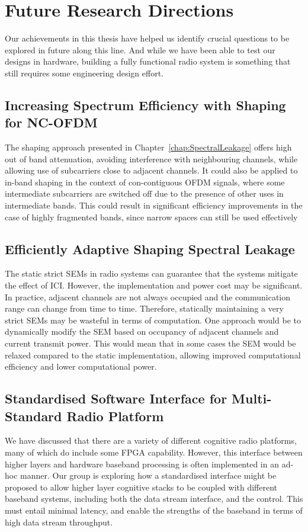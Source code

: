 \section{Future Research Directions}

Our achievements in this thesis have helped us identify crucial questions to be explored in future along this line. And while we have been able to test our designs in hardware, building a fully functional radio system is something that still requires some engineering design effort.

\subsection{Increasing Spectrum Efficiency with Shaping for NC-OFDM}
The shaping approach presented in Chapter~\ref{chap:SpectralLeakage} offers high out of band attenuation, avoiding interference with neighbouring channels, while allowing use of subcarriers close to adjacent channels.
It could also be applied to in-band shaping in the context of con-contiguous OFDM signals, where some intermediate subcarriers are switched off due to the presence of other uses in intermediate bands.
This could result in significant efficiency improvements in the case of highly fragmented bands, since narrow spaces can still be used effectively

\subsection{Efficiently Adaptive Shaping Spectral Leakage}
The static strict SEMs in radio systems can guarantee that the systems mitigate the effect of ICI. However, the implementation and power cost may be significant.
In practice, adjacent channels are not always occupied and the communication range can change from time to time. Therefore, statically maintaining a very strict SEMs may be wasteful in terms of computation.
One approach would be to dynamically modify the SEM based on occupancy of adjacent channels and current transmit power.
This would mean that in some cases the SEM would be relaxed compared to the static implementation, allowing improved computational efficiency and lower computational power.

\subsection{Standardised Software Interface for Multi-Standard Radio Platform}
We have discussed that there are a variety of different cognitive radio platforms, many of which do include some FPGA capability. However, this interface between higher layers and hardware baseband processing is often implemented in an ad-hoc manner. Our group is exploring how a standardised interface might be proposed to allow higher layer cognitive stacks to be coupled with different baseband systems, including both the data stream interface, and the control. This must entail minimal latency, and enable the strengths of the baseband in terms of high data stream throughput.


